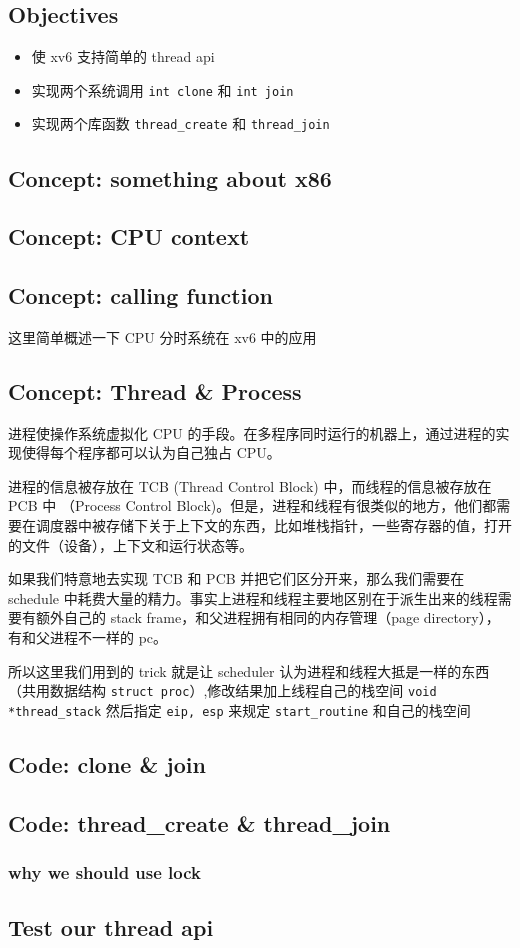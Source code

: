 \subsection{Objectives}

\begin{itemize}
    \item 使 xv6 支持简单的 thread api
    \item 实现两个系统调用 \texttt{int clone} 和 \texttt{int join}
    \item 实现两个库函数 \texttt{thread\_create} 和 \texttt{thread\_join}
\end{itemize}


\subsection{Concept: something about x86}

\subsection{Concept: CPU context}

\subsection{Concept: calling function}

这里简单概述一下 CPU 分时系统在 xv6 中的应用 

\subsection{Concept: Thread \& Process}

进程使操作系统虚拟化 CPU 的手段。在多程序同时运行的机器上，通过进程的实现使得每个程序都可以认为自己独占 CPU。

进程的信息被存放在 TCB (Thread Control Block) 中，而线程的信息被存放在 PCB 中 （Process Control Block)。但是，进程和线程有很类似的地方，他们都需要在调度器中被存储下关于上下文的东西，比如堆栈指针，一些寄存器的值，打开的文件（设备），上下文和运行状态等。

如果我们特意地去实现 TCB 和 PCB 并把它们区分开来，那么我们需要在 schedule 中耗费大量的精力。事实上进程和线程主要地区别在于派生出来的线程需要有额外自己的 stack frame，和父进程拥有相同的内存管理（page directory），有和父进程不一样的 pc。

所以这里我们用到的 trick 就是让 scheduler 认为进程和线程大抵是一样的东西（共用数据结构 \texttt{struct proc}）,修改结果加上线程自己的栈空间 \texttt{void *thread\_stack} 然后指定 \texttt{eip, esp} 来规定 \texttt{start\_routine} 和自己的栈空间

\subsection{Code: clone \& join}

\subsection{Code: thread\_create \& thread\_join}

\subsubsection{why we should use lock}

\subsection{Test our thread api}